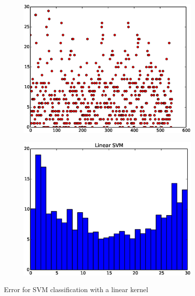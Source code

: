 \documentclass{article}
\begin{document}
\begin{figure}[H]
  \begin{subfigure}[!h]{0.5\textwidth}
    \centering
    \includegraphics[width=\textwidth]{./woodley/Linear_SVM_heading_plot.eps}
    \label{img:woodley_sample}
  \end{subfigure}
  \begin{subfigure}[!h]{0.5\textwidth}
    \centering
    \includegraphics[width=\textwidth]{./woodley/Linear_SVM_heading_bar.eps}
    \label{img:woodley_features}
  \end{subfigure}
  \caption{Error for SVM classification with a linear kernel}
\end{figure}
\end{document}
